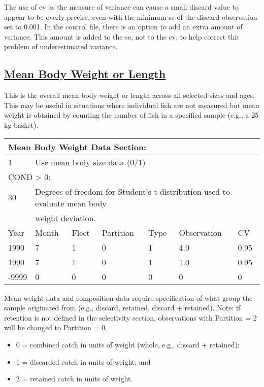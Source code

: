 The use of \gls{cv} as the measure of variance can cause a small discard value to appear to be overly precise, even with the minimum \gls{se} of the discard observation set to 0.001. In the control file, there is an option to add an extra amount of variance. This amount is added to the \gls{se}, not to the \gls{cv}, to help correct this problem of underestimated variance.

\hypertarget{MeanBodyWL}{}
\subsection[Mean Body Weight or Length]{\protect\hyperlink{MeanBodyWL}{Mean Body Weight or Length}}
This is the overall mean body weight or length across all selected sizes and ages. This may be useful in situations where individual fish are not measured but mean weight is obtained by counting the number of fish in a specified sample (e.g., a 25 kg basket).    

\begin{center}
	\begin{tabular}{p{1.75cm} p{1.75cm} p{1.75cm} p{1.75cm} p{1.75cm} p{2cm} p{1cm}}
		\multicolumn{7}{l}{Mean Body Weight Data Section:} \\
		\hline
		1  & \multicolumn{6}{l}{Use mean body size data (0/1)} \Tstrut\Bstrut\\
		\hline
		\multicolumn{7}{l}{COND > 0:}\Tstrut\\
		30 & \multicolumn{6}{l}{Degrees of freedom for Student's t-distribution used to evaluate mean body} \\
		  & \multicolumn{6}{l}{weight deviation.} \Bstrut\\
		\hline
		Year & Month & Fleet & Partition & Type & Observation & CV \Tstrut\Bstrut\\
		\hline
		1990  & 7 & 1 & 0 & 1 & 4.0 & 0.95 \Tstrut\\
		1990  & 7 & 1 & 0 & 1 & 1.0 & 0.95 \\
		-9999 & 0 & 0 & 0 & 0 & 0   & 0 \Bstrut\\
		\hline
	\end{tabular}
	\leavevmode\tagmcend\tagstructend\par
\end{center}


Mean weight data and composition data require specification of what group the sample originated from (e.g., discard, retained, discard + retained).
Note: if retention is not defined in the selectivity section, observations with Partition = 2 will be changed to Partition = 0.
\begin{itemize}
	\item 0 = combined catch in units of weight (whole, e.g., discard + retained);
	\item 1 = discarded catch in units of weight; and
	\item 2 = retained catch in units of weight.
\end{itemize}


